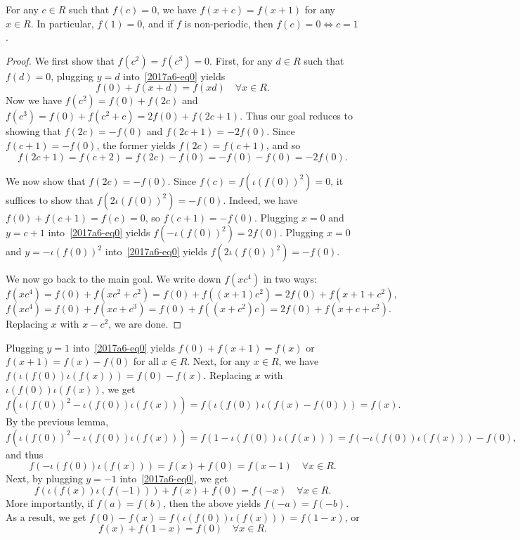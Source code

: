 \begin{theorem}
For any $c \in R$ such that $f(c) = 0$, we have $f(x + c) = f(x + 1)$ for any $x \in R$.
In particular, $f(1) = 0$, and if $f$ is non-periodic, then $f(c) = 0 \iff c = 1$.
\end{theorem}
\begin{proof}
We first show that $f(c^2) = f(c^3) = 0$.
First, for any $d \in R$ such that $f(d) = 0$, plugging $y = d$ into~\eqref{2017a6-eq0} yields
\[ f(0) + f(x + d) = f(xd) \quad \forall x \in R. \]
Now we have $f(c^2) = f(0) + f(2c)$ and $f(c^3) = f(0) + f(c^2 + c) = 2 f(0) + f(2c + 1)$.
Thus our goal reduces to showing that $f(2c) = -f(0)$ and $f(2c + 1) = -2 f(0)$.
Since $f(c + 1) = -f(0)$, the former yields $f(2c) = f(c + 1)$, and so
\[ f(2c + 1) = f(c + 2) = f(2c) - f(0) = -f(0) - f(0) = -2 f(0). \]

We now show that $f(2c) = -f(0)$.
Since $f(c) = f(\iota(f(0))^2) = 0$, it suffices to show that $f(2 \iota(f(0))^2) = -f(0)$.
Indeed, we have $f(0) + f(c + 1) = f(c) = 0$, so $f(c + 1) = -f(0)$.
Plugging $x = 0$ and $y = c + 1$ into~\eqref{2017a6-eq0} yields $f(- \iota(f(0))^2) = 2 f(0)$.
Plugging $x = 0$ and $y = -\iota(f(0))^2$ into~\eqref{2017a6-eq0} yields $f(2 \iota(f(0))^2) = -f(0)$.

We now go back to the main goal.
We write down $f(xc^4)$ in two ways:
\[ f(xc^4) = f(0) + f(xc^2 + c^2) = f(0) + f((x + 1) c^2) = 2 f(0) + f(x + 1 + c^2), \]
\[ f(xc^4) = f(0) + f(xc + c^3) = f(0) + f((x + c^2) c) = 2 f(0) +  f(x + c + c^2). \]
Replacing $x$ with $x - c^2$, we are done.
\end{proof}

Plugging $y = 1$ into~\eqref{2017a6-eq0} yields $f(0) + f(x + 1) = f(x)$ or $f(x + 1) = f(x) - f(0)$ for all $x \in R$.
Next, for any $x \in R$, we have $f(\iota(f(0)) \iota(f(x))) = f(0) - f(x)$.
Replacing $x$ with $\iota(f(0)) \iota(f(x))$, we get
\[ f(\iota(f(0))^2 - \iota(f(0)) \iota(f(x))) = f(\iota(f(0)) \iota(f(x) - f(0))) = f(x). \]
By the previous lemma,
\[ f(\iota(f(0))^2 - \iota(f(0)) \iota(f(x))) = f(1 - \iota(f(0)) \iota(f(x))) = f(-\iota(f(0)) \iota(f(x))) - f(0), \]
    and thus \[ f(-\iota(f(0)) \iota(f(x))) = f(x) + f(0) = f(x - 1) \quad \forall x \in R. \tag{1.1}\label{2017a6-eq1-1} \]
Next, by plugging $y = -1$ into~\eqref{2017a6-eq0}, we get
\[ f(\iota(f(x)) \iota(f(-1))) + f(x) + f(0) = f(-x) \quad \forall x \in R. \]
More importantly, if $f(a) = f(b)$, then the above yields $f(-a) = f(-b)$.
As a result, we get $f(0) - f(x) = f(\iota(f(0)) \iota(f(x))) = f(1 - x)$, or
\[ f(x) + f(1 - x) = f(0) \quad \forall x \in R. \tag{1.2}\label{2017a6-eq1-2} \]





